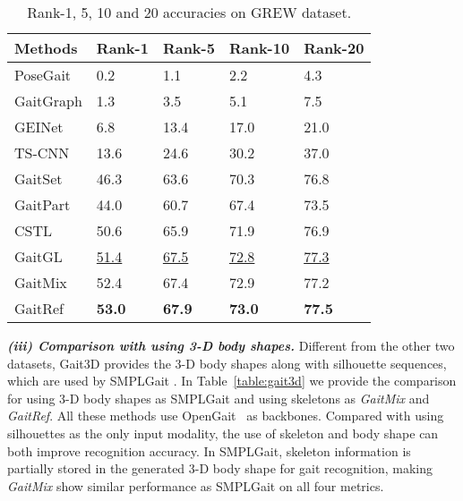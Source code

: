 \documentclass[10pt,twocolumn,letterpaper]{article}
\begin{document}
 \begin{table}
\begin{center}
\def\lw{1.3}
\resizebox{0.9\columnwidth}{!}
{
\begin{tabular}{p{2.5cm}p{\lw cm}<{\centering}p{\lw cm}<{\centering}p{\lw cm}<{\centering}p{\lw cm}<{\centering}}
\toprule
Methods &  Rank-1 & Rank-5 & Rank-10 & Rank-20  \\
 \midrule
PoseGait \cite{liao2020model} & 0.2 & 1.1 & 2.2 & 4.3\\
GaitGraph \cite{teepe2021gaitgraph} & 1.3 & 3.5 & 5.1 & 7.5\\
GEINet \cite{shiraga2016geinet} & 6.8 & 13.4 & 17.0 & 21.0\\
TS-CNN \cite{wu2016comprehensive} & 13.6 & 24.6 & 30.2 & 37.0\\
GaitSet \cite{chao2019gaitset}& 46.3 & 63.6 & 70.3 & 76.8\\
GaitPart \cite{fan2020gaitpart} & 44.0 & 60.7 & 67.4 & 73.5 \\
CSTL \cite{huang2021context} & 50.6 & 65.9 & 71.9 & 76.9 \\
GaitGL \cite{lin2021gaitgl} & \underline{51.4} & \underline{67.5} & \underline{72.8} & \underline{77.3} \\
\midrule
GaitMix   & {52.4} & 67.4 & {72.9} & 77.2 \\
GaitRef & \textbf{53.0} & \textbf{67.9} & \textbf{73.0} & \textbf{77.5}\\
\bottomrule
\end{tabular}}
\end{center}
\caption{Rank-1, 5, 10 and 20 accuracies on GREW dataset.}
\label{table:grew}
\end{table}
     
    \textbf{\textit{(iii) Comparison with using 3-D body shapes.}} Different from the other two datasets, Gait3D \cite{zheng2022gait} provides the 3-D body shapes along with silhouette sequences, which are used by SMPLGait \cite{zheng2022gait}. In Table~\ref{table:gait3d} we provide the comparison for using 3-D body shapes as SMPLGait \cite{zheng2022gait} and using skeletons as \textit{GaitMix} and \textit{GaitRef}. All these methods use OpenGait~\cite{zheng2022gait} as backbones. Compared with using silhouettes as the only input modality, the use of skeleton and body shape can both improve recognition accuracy. In SMPLGait, skeleton information is partially stored in the generated 3-D body shape for gait recognition, making \textit{GaitMix} show similar performance as SMPLGait on all four metrics.
    
\end{document}
